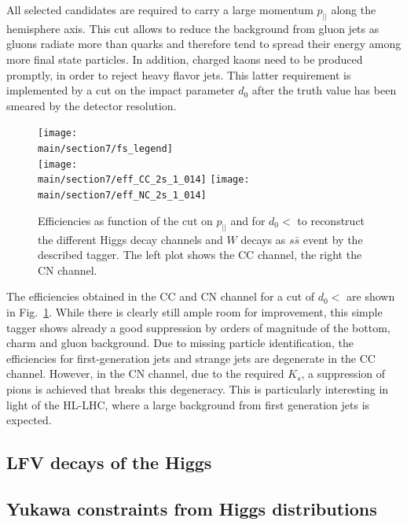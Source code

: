 \documentclass[../report.tex]{subfiles}
\providecommand{\main}{..}
\begin{document}
All selected candidates are required to carry a large momentum $p_{||}$ along the hemisphere
axis. This cut allows to reduce the background from gluon jets as gluons radiate more than quarks
and therefore tend to spread their energy among more final state particles. In addition, charged
kaons need to be produced promptly, in order to reject heavy flavor jets. This latter requirement is
implemented by a cut on the impact parameter $d_0$ after the truth value has been smeared by the
detector resolution.
\begin{figure}[tb]
  \centering
  \texttt{[image: \\main/section7/fs\_legend]}\\
  \texttt{[image: \\main/section7/eff\_CC\_2s\_1\_014]}
  \texttt{[image: \\main/section7/eff\_NC\_2s\_1\_014]}
  \caption{Efficiencies as function of the cut on $p_{||}$ and for $d_0<$ to
    reconstruct the different Higgs decay channels and $W$ decays as $s\bar s$ event by the
    described tagger. The left plot shows the CC channel, the right the CN channel.}
  \label{fig:stagger-efficiencies}
\end{figure}

The efficiencies obtained in the CC and CN channel for a cut of $d_0<$ are shown in
Fig.~\ref{fig:stagger-efficiencies}. While there is clearly still ample room for improvement, this
simple tagger shows already a good suppression by orders of magnitude of the bottom, charm and gluon
background. Due to missing particle identification, the efficiencies for first-generation jets and
strange jets are degenerate in the CC channel. However, in the CN channel, due to the required
$K_s$, a suppression of pions is achieved that breaks this degeneracy. This is particularly
interesting in light of the HL-LHC, where a large background from first generation jets is expected.

\subsection{LFV decays of the Higgs}


\subsection{Yukawa constraints from Higgs distributions}
\end{document}
